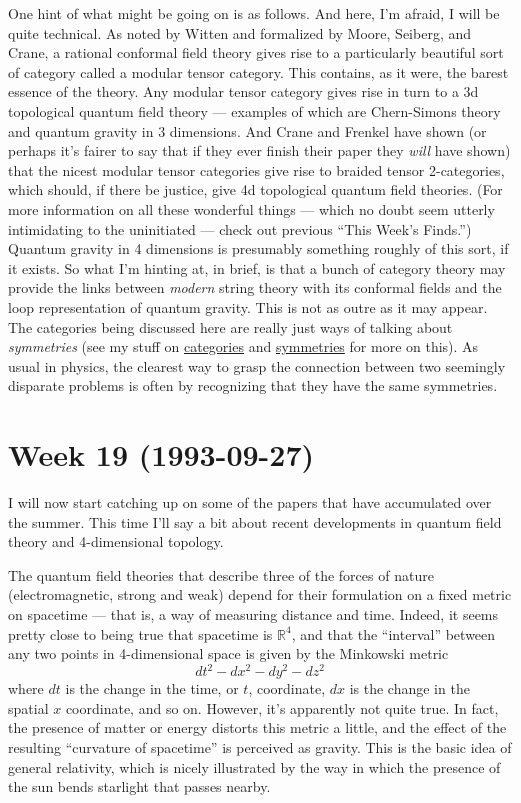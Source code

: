 \documentclass{article}
\begin{document}
One hint of what might be going on is as follows. And here, I'm afraid,
I will be quite technical. As noted by Witten and formalized by Moore,
Seiberg, and Crane, a rational conformal field theory gives rise to a
particularly beautiful sort of category called a modular tensor
category. This contains, as it were, the barest essence of the theory.
Any modular tensor category gives rise in turn to a 3d topological
quantum field theory --- examples of which are Chern-Simons theory and
quantum gravity in 3 dimensions. And Crane and Frenkel have shown (or
perhaps it's fairer to say that if they ever finish their paper they
\emph{will} have shown) that the nicest modular tensor categories give
rise to braided tensor 2-categories, which should, if there be justice,
give 4d topological quantum field theories. (For more information on all
these wonderful things --- which no doubt seem utterly intimidating to
the uninitiated --- check out previous ``This Week's Finds.'') Quantum
gravity in 4 dimensions is presumably something roughly of this sort, if
it exists. So what I'm hinting at, in brief, is that a bunch of category
theory may provide the links between \emph{modern} string theory with
its conformal fields and the loop representation of quantum gravity.
This is not as outre as it may appear. The categories being discussed
here are really just ways of talking about \emph{symmetries} (see my
stuff on
\href{http://math.ucr.edu/home/baez/categories.html}{categories} and
\href{http://math.ucr.edu/home/baez/symmetries.html}{symmetries} for
more on this). As usual in physics, the clearest way to grasp the
connection between two seemingly disparate problems is often by
recognizing that they have the same symmetries.
\hypertarget{week19}{%
\section{Week 19 (1993-09-27)}\label{week19}}

I will now start catching up on some of the papers that have accumulated
over the summer. This time I'll say a bit about recent developments in
quantum field theory and 4-dimensional topology.

The quantum field theories that describe three of the forces of nature
(electromagnetic, strong and weak) depend for their formulation on a
fixed metric on spacetime --- that is, a way of measuring distance and
time. Indeed, it seems pretty close to being true that spacetime is
\(\mathbb{R}^4\), and that the ``interval'' between any two points in
4-dimensional space is given by the Minkowski metric
\[dt^2 -dx^2 -dy^2 -dz^2\] where \(dt\) is the change in the time, or
\(t\), coordinate, \(dx\) is the change in the spatial \(x\) coordinate,
and so on. However, it's apparently not quite true. In fact, the
presence of matter or energy distorts this metric a little, and the
effect of the resulting ``curvature of spacetime'' is perceived as
gravity. This is the basic idea of general relativity, which is nicely
illustrated by the way in which the presence of the sun bends starlight
that passes nearby.
\end{document}
